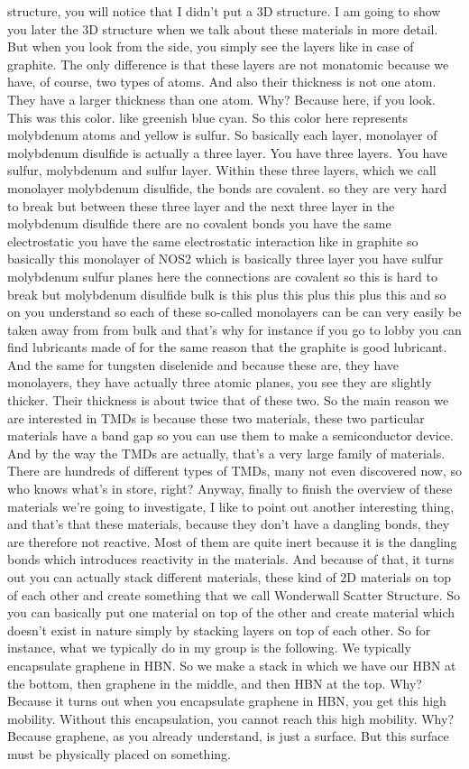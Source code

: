 structure, you will notice that I didn't put a 3D structure. I am going to show you later the 3D structure when we talk about these materials in more detail. But when you look from the side, you simply see the layers like in case of graphite. The only difference is that these layers are not monatomic because we have, of course, two types of atoms. And also their thickness is not one atom. They have a larger thickness than one atom. Why? Because here, if you look. This was this color. like greenish blue cyan. So this color here represents molybdenum atoms and yellow is sulfur. So basically each layer, monolayer of molybdenum disulfide is actually a three layer. You have three layers. You have sulfur, molybdenum and sulfur layer. Within these three layers, which we call monolayer molybdenum disulfide, the bonds are covalent. so they are very hard to break but between these three layer and the next three layer in the molybdenum disulfide there are no covalent bonds you have the same electrostatic you have the same electrostatic interaction like in graphite so basically this monolayer of NOS2 which is basically three layer you have sulfur molybdenum sulfur planes here the connections are covalent so this is hard to break but molybdenum disulfide bulk is this plus this plus this plus this and so on you understand so each of these so-called monolayers can be can very easily be taken away from from bulk and that's why for instance if you go to lobby you can find lubricants made of for the same reason that the graphite is good lubricant. And the same for tungsten diselenide and because these are, they have monolayers, they have actually three atomic planes, you see they are slightly thicker. Their thickness is about twice that of these two. So the main reason we are interested in TMDs is because these two materials, these two particular materials have a band gap so you can use them to make a semiconductor device. And by the way the TMDs are actually, that's a very large family of materials. There are hundreds of different types of TMDs, many not even discovered now, so who knows what's in store, right? Anyway, finally to finish the overview of these materials we're going to investigate, I like to point out another interesting thing, and that's that these materials, because they don't have a dangling bonds, they are therefore not reactive. Most of them are quite inert because it is the dangling bonds which introduces reactivity in the materials. And because of that, it turns out you can actually stack different materials, these kind of 2D materials on top of each other and create something that we call Wonderwall Scatter Structure. So you can basically put one material on top of the other and create material which doesn't exist in nature simply by stacking layers on top of each other. So for instance, what we typically do in my group is the following. We typically encapsulate graphene in HBN. So we make a stack in which we have our HBN at the bottom, then graphene in the middle, and then HBN at the top. Why? Because it turns out when you encapsulate graphene in HBN, you get this high mobility. Without this encapsulation, you cannot reach this high mobility. Why? Because graphene, as you already understand, is just a surface. But this surface must be physically placed on something. 